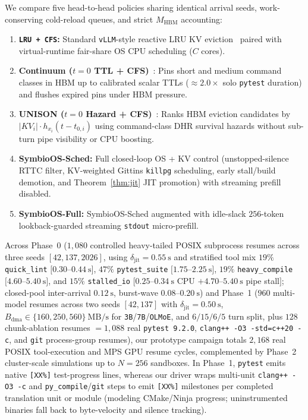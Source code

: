 \documentclass[10pt,journal,compsoc]{IEEEtran}
\theoremstyle{definition}
\theoremstyle{remark}
\newcommand{\SymbioSched}{\textup{\textsc{SymbioOS-Sched}}}
\newcommand{\SymbioFull}{\textup{\textsc{SymbioOS-Full}}}
\newcommand{\Continuum}{\textup{\textsc{Continuum}}}
\newcommand{\UNISON}{\textup{\textsc{UNISON}}}
\def\SymbioSched{SymbioOS-Sched}%
\def\SymbioFull{SymbioOS-Full}%
\def\Continuum{Continuum}%
\def\UNISON{UNISON}%
\begin{document}
We compare five head-to-head policies sharing identical arrival seeds, work-conserving cold-reload queues, and strict $M_{\mathrm{HBM}}$ accounting:
\begin{enumerate}
\item \textbf{\texttt{LRU + CFS}:} Standard \texttt{vLLM}-style reactive LRU KV eviction~\cite{kwon2023vllm} paired with virtual-runtime fair-share OS CPU scheduling ($C$ cores).
\item \textbf{\Continuum{} ($t=0$ TTL + CFS)}~\cite{li2025continuum}: Pins short and medium command classes in HBM up to calibrated scalar TTLs ($\approx 2.0\times$ solo \texttt{pytest} duration) and flushes expired pins under HBM pressure.
\item \textbf{\UNISON{} ($t=0$ Hazard + CFS)}~\cite{he2026unison}: Ranks HBM eviction candidates by $|KV_i| \cdot h_{x_i}(t - t_{0,i})$ using command-class DHR survival hazards without sub-turn pipe visibility or CPU boosting.
\item \textbf{\SymbioSched{}:} Full closed-loop OS + KV control (unstopped-silence RTTC filter, KV-weighted Gittins \texttt{killpg} scheduling, early stall/build demotion, and Theorem~\ref{thm:jit} JIT promotion) with streaming prefill disabled.
\item \textbf{\SymbioFull{}:} \SymbioSched{} augmented with idle-slack $256$-token lookback-guarded streaming \texttt{stdout} micro-prefill.
\end{enumerate}

Across Phase~0 ($1{,}080$ controlled heavy-tailed POSIX subprocess resumes across three seeds $[42, 137, 2026]$, using $\delta_{\mathrm{jit}} = 0.55~\mathrm{s}$ and stratified tool mix $19\%$ \texttt{quick\_lint} $[0.30$--$0.44~\mathrm{s}]$, $47\%$ \texttt{pytest\_suite} $[1.75$--$2.25~\mathrm{s}]$, $19\%$ \texttt{heavy\_compile} $[4.60$--$5.40~\mathrm{s}]$, and $15\%$ \texttt{stalled\_io} $[0.25$--$0.34~\mathrm{s}$ CPU $+ 4.70$--$5.40~\mathrm{s}$ pipe stall$]$; closed-pool inter-arrival $0.12~\mathrm{s}$, burst-wave $0.08$--$0.20~\mathrm{s}$) and Phase~1 ($960$ multi-model resumes across two seeds $[42, 137]$ with $\delta_{\mathrm{jit}} = 0.50~\mathrm{s}$, $B_{\mathrm{dma}} \in \{160, 250, 560\}~\mathrm{MB/s}$ for \texttt{3B}/\texttt{7B}/\texttt{OLMoE}, and $6/15/6/5$ turn split, plus $128$ chunk-ablation resumes $= 1{,}088$ real \texttt{pytest~9.2.0}, \texttt{clang++ -O3 -std=c++20 -c}, and \texttt{git} process-group resumes), our prototype campaign totals $2{,}168$ real POSIX tool-execution and MPS GPU resume cycles, complemented by Phase~2 cluster-scale simulations up to $N = 256$ sandboxes. In Phase~1, \texttt{pytest} emits native \texttt{[XX\%]} test-progress lines, whereas our driver wraps multi-unit \texttt{clang++ -O3 -c} and \texttt{py\_compile}/\texttt{git} steps to emit \texttt{[XX\%]} milestones per completed translation unit or module (modeling CMake/Ninja progress; uninstrumented binaries fall back to byte-velocity and silence tracking).
\end{document}
